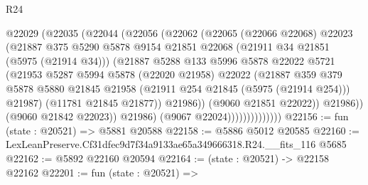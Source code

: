 \begin{lexlean}{R24}
\begin{coremodule}
                            @22029
                              (@22035
                                (@22044
                                  (@22056
                                    (@22062
                                      (@22065
                                        (@22066 @22068)
                                        @22023
                                        (@21887
                                          @375
                                          @5290
                                          @5878
                                          @9154
                                          @21851
                                          @22068
                                          (@21911 @34 @21851 (@5975 (@21914 @34)))
                                          (@21887
                                            @5288
                                            @133
                                            @5996
                                            @5878
                                            @22022
                                            @5721
                                            (@21953
                                              @5287
                                              @5994
                                              @5878
                                              (@22020 @21958)
                                              @22022
                                              (@21887
                                                @359
                                                @379
                                                @5878
                                                @5880
                                                @21845
                                                @21958
                                                (@21911 @254 @21845 (@5975 (@21914 @254)))
                                                @21987)
                                              (@11781 @21845 @21877))
                                            @21986))
                                        (@9060 @21851 @22022))
                                      @21986))
                                  (@9060 @21842 @22023))
                                @21986)
                              (@9067 @22024))))))))))))))
@22156 := fun (state : @20521) => @5881 @20588
@22158 := @5886 @5012 @20585
@22160 := LexLeanPreserve.Cf31dfec9d7f34a9133ae65a349666318.R24.__fits_116 @5685
@22162 := @5892 @22160 @20594
@22164 := (state : @20521) -> @22158 @22162
@22201 := fun (state : @20521) =>

\end{coremodule}
\end{lexlean}
